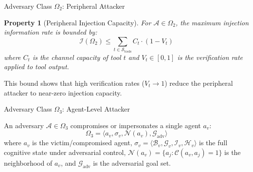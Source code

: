 \documentclass[
  ignorenonframetext,
]{beamer}
\newtheorem{property}{Property}
\begin{document}
\begin{frame}[allowframebreaks]{Adversary Class \(\Omega_2\): Peripheral
Attacker}
\begin{property}[Peripheral Injection Capacity]
\label{prop:omega2-injection}
For $\mathcal{A} \in \Omega_2$, the maximum injection information rate is bounded by:
\begin{equation}
\label{eq:omega2-rate}
\mathcal{I}(\Omega_2) \leq \sum_{t \in \mathcal{S}_{\text{tools}}} C_t \cdot (1 - V_t)
\end{equation}
where $C_t$ is the channel capacity of tool $t$ and $V_t \in [0,1]$ is the verification rate applied to tool output.
\end{property}

This bound shows that high verification rates (\(V_t \to 1\)) reduce the
peripheral attacker to near-zero injection capacity.
\end{frame}

\begin{frame}[allowframebreaks]{Adversary Class \(\Omega_3\):
Agent-Level Attacker}
\protect{}\label{adversary-class-omega_3-agent-level-attacker}
\begin{definition}
\label{def:omega3}
An adversary $\mathcal{A} \in \Omega_3$ compromises or impersonates a single agent $a_v$:
\begin{equation}
\label{eq:omega3-formal}
\Omega_3 = \langle a_v, \sigma_v, \mathcal{N}(a_v), \mathcal{G}_{\text{adv}} \rangle
\end{equation}
where $a_v$ is the victim/compromised agent, $\sigma_v = \langle \mathcal{B}_v, \mathcal{G}_v, \mathcal{I}_v, \mathcal{H}_v \rangle$ is the full cognitive state under adversarial control, $\mathcal{N}(a_v) = \{a_j : \mathcal{C}(a_v, a_j) = 1\}$ is the neighborhood of $a_v$, and $\mathcal{G}_{\text{adv}}$ is the adversarial goal set.
\end{definition}

\end{frame}
\end{document}
